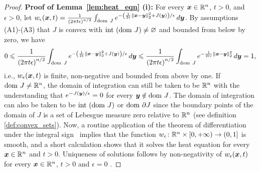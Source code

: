\begin{proof}
\textbf{Proof of Lemma~\ref{lem:heat_eqn} (i):} For every $\boldsymbol{x} \in \mathbb{R}^n$, $t>0$, and $\epsilon>0$, let $w_\epsilon(\boldsymbol{x},t) = \frac{1}{\left(2\pi t\epsilon\right)^{n/2}} \int_{\mathrm{dom~} J} e^{-\left(\frac{1}{2t}\left\Vert \boldsymbol{x}-\boldsymbol{y}\right\Vert _{2}^{2}+J(\boldsymbol{y})\right)/\epsilon}\mathop{}\!d\boldsymbol{y}$. By assumptions (A1)-(A3) that $J$ is convex with $\mathrm{int~}(\mathrm{dom~} J) \neq \varnothing$ and bounded from below by zero, we have
\[
0 \leqslant \frac{1}{\left(2\pi t\epsilon\right)^{n/2}} \int_{\mathrm{dom~} J} e^{-\left(\frac{1}{2t}\left\Vert \boldsymbol{x}-\boldsymbol{y}\right\Vert _{2}^{2}+J(\boldsymbol{y})\right)/\epsilon}\mathop{}\!d\boldsymbol{y} \leqslant \frac{1}{\left(2\pi t\epsilon\right)^{n/2}} \int_{\mathrm{dom~} J} e^{-\frac{1}{2t\epsilon}\left\Vert \boldsymbol{x}-\boldsymbol{y}\right\Vert _{2}^{2}}\mathop{}\!d\boldsymbol{y} = 1,
\]
i.e., $w_\epsilon(\boldsymbol{x},t)$ is finite, non-negative and bounded from above by one. If $\mathrm{dom~} J \neq \mathbb{R}^n$, the domain of integration can still be taken to be $\mathbb{R}^n$ with the understanding that $e^{-J(\boldsymbol{y})/\epsilon} = 0$ for every $\boldsymbol{y}\notin\mathrm{dom~} J$. The domain of integration can also be taken to be $\mathrm{int~}(\mathrm{dom~} J)$ or $\mathrm{dom~}\partial J$ since the boundary points of the domain of $J$ is a set of Lebesgue measure zero relative to $\mathbb{R}^n$ (see definition \ref{def:convex_sets}). Now, a routine application of the theorem of differentiation under the integral sign~\cite{folland2013real} implies that the function $w_\epsilon\colon\mathbb{R}^n\times[0,+\infty) \to (0,1]$ is smooth, and a short calculation shows that it solves the heat equation for every $\boldsymbol{x} \in \mathbb{R}^n$ and $t > 0$. Uniqueness of solutions follows by non-negativity of $w_\epsilon(\boldsymbol{x},t)$ for every $\boldsymbol{x} \in \mathbb{R}^n$, $t>0$ and $\epsilon = 0$ \cite{donnelly1987uniqueness}.


\end{proof}
